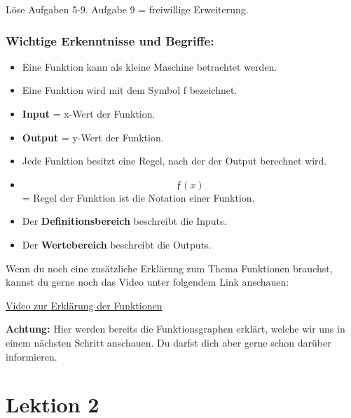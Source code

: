 \documentclass[
  10pt,
  a4paper,
  DIV=11]{scrartcl}
\providecommand{\tightlist}{%
  \setlength{\itemsep}{0pt}\setlength{\parskip}{0pt}}\usepackage{longtable,booktabs,array}
\theoremstyle{definition}
\theoremstyle{remark}
\begin{document}
Löse Aufgaben 5-9. Aufgabe 9 = freiwillige Erweiterung.

\subsubsection{Wichtige Erkenntnisse und
Begriffe:}\label{wichtige-erkenntnisse-und-begriffe}

\begin{itemize}
\tightlist
\item
  Eine Funktion kann als kleine Maschine betrachtet werden.
\item
  Eine Funktion wird mit dem Symbol ƒ bezeichnet.
\item
  \textbf{Input} = x-Wert der Funktion.
\item
  \textbf{Output} = y-Wert der Funktion.
\item
  Jede Funktion besitzt eine Regel, nach der der Output berechnet wird.
\item
  \[ ƒ(x) \] = Regel der Funktion ist die Notation einer Funktion.
\item
  Der \textbf{Definitionsbereich} beschreibt die Inputs.
\item
  Der \textbf{Wertebereich} beschreibt die Outputs.
\end{itemize}

Wenn du noch eine zusätzliche Erklärung zum Thema Funktionen brauchst,
kannst du gerne noch das Video unter folgendem Link anschauen:

\href{https://youtu.be/myLx0d5wmHw?si=vB-aI0zptBWo8Rt4}{Video zur
Erklärung der Funktionen}

\textbf{Achtung:} Hier werden bereits die Funktionsgraphen erklärt,
welche wir uns in einem nächsten Schritt anschauen. Du darfst dich aber
gerne schon darüber informieren.

\section{Lektion 2}\label{lektion-2}
\end{document}

